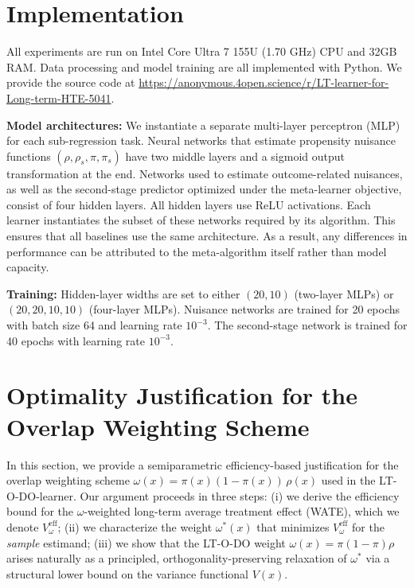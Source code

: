 \documentclass{article}
\theoremstyle{plain}
\theoremstyle{definition}
\theoremstyle{remark}
\newcommand{\1}{\mathds{1}}                %
\begin{document}

\newpage
\section{Implementation}
\label{app:implementation}
All experiments are run on Intel Core Ultra 7 155U (1.70 GHz) CPU and 32GB RAM. Data processing and model training are all implemented with Python. We provide the source code at \href{https://anonymous.4open.science/r/LT-learner-for-Long-term-HTE-5041}{https://anonymous.4open.science/r/LT-learner-for-Long-term-HTE-5041}.

\textbf{Model architectures: } We instantiate a separate multi-layer perceptron (MLP) for each sub-regression task. Neural networks that estimate propensity nuisance functions $(\rho,\rho_s,\pi,\pi_s)$ have two middle layers and a sigmoid output transformation at the end. Networks used to estimate outcome-related nuisances, as well as the second-stage predictor optimized under the meta-learner objective, consist of four hidden layers. All hidden layers use ReLU activations. Each learner instantiates the subset of these networks required by its algorithm. This ensures that all baselines use the same architecture. As a result, any differences in performance can be attributed to the meta-algorithm itself rather than model capacity.

\textbf{Training: } Hidden-layer widths are set to either $(20,10)$ (two-layer MLPs) or $(20,20,10,10)$ (four-layer MLPs). Nuisance networks are trained for 20 epochs with batch size 64 and learning rate $10^{-3}$. The second-stage network is trained for 40 epochs with learning rate $10^{-3}$.



%
%
%
%
%
%
%
%
%
%
%
%
%
%
%
%
%
\newpage
\section{Optimality Justification for the Overlap Weighting Scheme}
\label{sec:optimality}

In this section, we provide a semiparametric efficiency-based justification for the
overlap weighting scheme $\omega(x) = \pi(x)(1-\pi(x))\,\rho(x)$ used in the
LT-O-DO-learner. Our argument proceeds in three steps:
(i) we derive the efficiency bound for the $\omega$-weighted long-term average treatment
effect (WATE), which we denote $V^{\text{eff}}_\omega$;
(ii) we characterize the weight $\omega^*(x)$ that minimizes $V^{\text{eff}}_\omega$ for the
\emph{sample} estimand;
(iii) we show that the LT-O-DO weight $\omega(x) = \pi(1-\pi)\rho$ arises naturally as a
principled, orthogonality-preserving relaxation of $\omega^*$ via a structural lower bound
on the variance functional $V(x)$.
\end{document}
